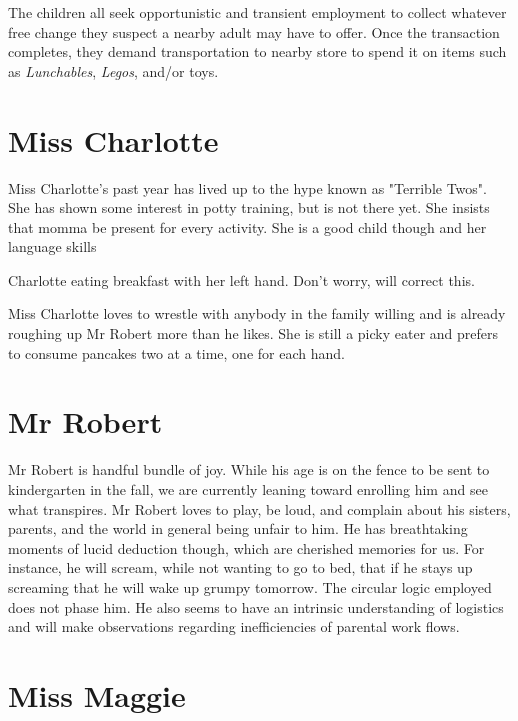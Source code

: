 \documentclass[letterpaper,11pt]{article}
\makeatletter
\newenvironment{figurehere}
  {\def\@captype{figure}}
  {}
\makeatother
\begin{document}
\begin{multicols}{2}
The children all seek opportunistic and transient employment to collect whatever
free change they suspect a nearby adult may have to offer.  Once the transaction
completes, they demand transportation to nearby store to spend it on items such
as \textit{Lunchables}, \textit{Legos}, and/or toys.

\section{Miss Charlotte}

Miss Charlotte's past year has lived up to the hype known as "Terrible Twos". She
has shown some interest in potty training, but is not there yet.  She insists that
momma be present for every activity.  She is a good child though and her language
skills 

\bigskip

\begin{figurehere}
 \centering   
 \caption{Charlotte eating breakfast with her left hand. Don't worry, will correct this.}
\end{figurehere}

\bigskip

Miss Charlotte loves to wrestle with anybody in the family willing and is already
roughing up Mr Robert more than he likes.  She is still a picky eater and prefers
to consume pancakes two at a time, one for each hand.

\section{Mr Robert}

Mr Robert is handful bundle of joy.  While his age is on the fence to be sent
to kindergarten in the fall, we are currently leaning toward enrolling him and
see what transpires. Mr Robert loves to play, be loud, and complain about his sisters,
parents, and the world in general being unfair to him.  He has breathtaking moments of
lucid deduction though, which are cherished memories for us.  For instance, he will
scream, while not wanting to go to bed, that if he stays up screaming that he will 
wake up grumpy tomorrow. The circular logic employed does not phase him.
He also seems to have an intrinsic understanding of
logistics and will make observations regarding inefficiencies of parental
work flows.

\section{Miss Maggie}


\end{multicols}
\end{document}
